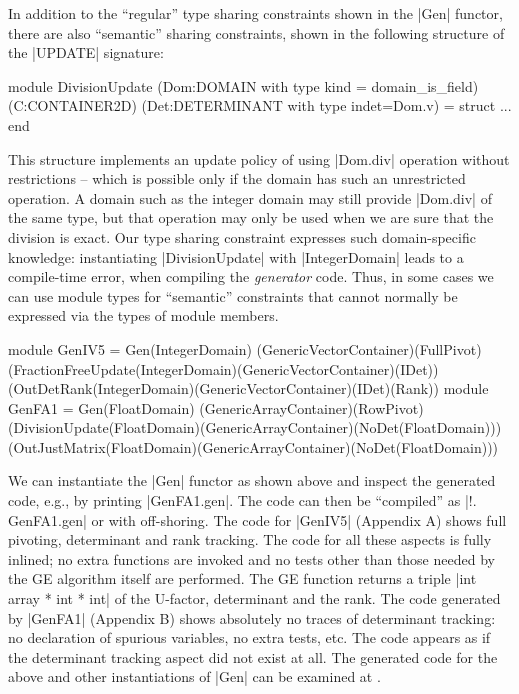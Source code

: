 \documentclass{llncs}
\begin{document}
In addition to the ``regular'' type sharing constraints shown in the
|Gen| functor, there are also ``semantic'' sharing constraints, shown
in the following structure of the |UPDATE| signature:
\vspace*{-5pt}\begin{code}
module DivisionUpdate
  (Dom:DOMAIN with type kind = domain_is_field)
  (C:CONTAINER2D)
  (Det:DETERMINANT with type indet=Dom.v) = struct ... end
\end{code}
\vspace*{-4pt} 
This structure implements an update policy of using
|Dom.div| operation without restrictions -- which is possible only if
the domain has such an unrestricted operation. A domain such as the integer
domain may still provide |Dom.div| of the same type, but that operation may
only be used when we are sure that the division is exact. Our type
sharing constraint expresses such domain-specific knowledge:
instantiating |DivisionUpdate| with |IntegerDomain| leads to a
compile-time error, when compiling the \emph{generator} code. Thus, in
some cases we can use module types for ``semantic'' constraints
that cannot normally be expressed via the types of module members.
\vspace*{-5pt}
\begin{code}
module GenIV5 = Gen(IntegerDomain)
   (GenericVectorContainer)(FullPivot)
   (FractionFreeUpdate(IntegerDomain)(GenericVectorContainer)(IDet))
   (OutDetRank(IntegerDomain)(GenericVectorContainer)(IDet)(Rank))
module GenFA1 = Gen(FloatDomain)
   (GenericArrayContainer)(RowPivot)
   (DivisionUpdate(FloatDomain)(GenericArrayContainer)(NoDet(FloatDomain)))
   (OutJustMatrix(FloatDomain)(GenericArrayContainer)(NoDet(FloatDomain)))
\end{code}
\vspace*{-5pt}
We can instantiate the |Gen| functor as shown above and inspect the generated
code, e.g., by printing |GenFA1.gen|. The code can then be ``compiled'' as 
|!. GenFA1.gen| or with off-shoring. The code for |GenIV5| (Appendix A) shows
full pivoting, determinant and rank tracking. The code for all these aspects is
fully inlined; no extra functions are invoked and no tests other than those
needed by the GE algorithm itself are performed. The GE function returns a
triple |int array * int * int| of the U-factor, determinant and the rank. The
code generated by |GenFA1| (Appendix B) shows absolutely no traces of
determinant tracking: no declaration of spurious variables, no extra tests,
etc. The code appears as if the determinant tracking aspect did not exist
at all. The generated code for the above and other instantiations of
|Gen| can be examined at \cite{metamonadsURL}.
\end{document}
